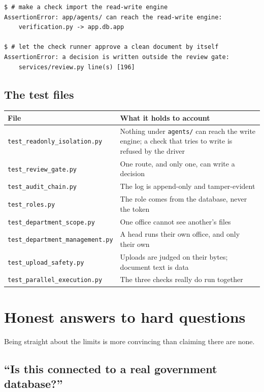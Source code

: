 \documentclass[11pt,a4paper]{article}
\begin{document}
\begin{lstlisting}
$ # make a check import the read-write engine
AssertionError: app/agents/ can reach the read-write engine:
    verification.py -> app.db.app

$ # let the check runner approve a clean document by itself
AssertionError: a decision is written outside the review gate:
    services/review.py line(s) [196]
\end{lstlisting}

\subsection{The test files}

\begin{longtable}{@{}p{6cm}p{8.6cm}@{}}
\toprule
\textbf{File} & \textbf{What it holds to account} \\
\midrule
\endhead
\texttt{test\_readonly\_isolation.py} & Nothing under \texttt{agents/} can reach
the write engine; a check that tries to write is refused by the driver \\
\texttt{test\_review\_gate.py} & One route, and only one, can write a decision \\
\texttt{test\_audit\_chain.py} & The log is append-only and tamper-evident \\
\texttt{test\_roles.py} & The role comes from the database, never the token \\
\texttt{test\_department\_scope.py} & One office cannot see another's files \\
\texttt{test\_department\_management.py} & A head runs their own office, and
only their own \\
\texttt{test\_upload\_safety.py} & Uploads are judged on their bytes; document
text is data \\
\texttt{test\_parallel\_execution.py} & The three checks really do run together \\
\bottomrule
\end{longtable}

\newpage

\section{Honest answers to hard questions}

Being straight about the limits is more convincing than claiming there are none.

\subsection*{``Is this connected to a real government database?''}
\end{document}
